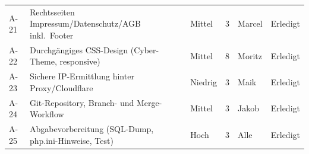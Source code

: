 \begin{small}
\begin{longtable}{@{}L{0.95cm} L{6.9cm} L{1.1cm} L{0.7cm} L{1.7cm} L{1.6cm}@{}}
A-21 & Rechtsseiten Impressum/Datenschutz/AGB inkl.\ Footer & Mittel & 3 & Marcel & Erledigt \\
A-22 & Durchg\"angiges CSS-Design (Cyber-Theme, responsive) & Mittel & 8 & Moritz & Erledigt \\
A-23 & Sichere IP-Ermittlung hinter Proxy/Cloudflare & Niedrig & 3 & Maik & Erledigt \\
A-24 & Git-Repository, Branch- und Merge-Workflow & Mittel & 3 & Jakob & Erledigt \\
A-25 & Abgabevorbereitung (SQL-Dump, php.ini-Hinweise, Test) & Hoch & 3 & Alle & Erledigt \\
\end{longtable}
\end{small}
